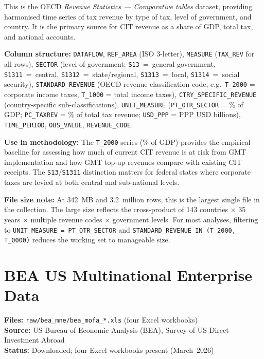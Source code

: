 \documentclass[11pt,a4paper]{article}
\newcommand{\code}[1]{\texttt{#1}}
\begin{document}
This is the OECD \emph{Revenue Statistics --- Comparative tables} dataset, providing harmonised time series of tax revenue by type of tax, level of government, and country.  It is the primary source for CIT revenue as a share of GDP, total tax, and national accounts.

\noindent\textbf{Column structure:} \texttt{DATAFLOW}, \texttt{REF\_AREA} (ISO 3-letter), \texttt{MEASURE} (\code{TAX\_REV} for all rows), \texttt{SECTOR} (level of government: \texttt{S13}~=~general government, \texttt{S1311}~=~central, \texttt{S1312}~=~state/regional, \texttt{S1313}~=~local, \texttt{S1314}~=~social security), \texttt{STANDARD\_REVENUE} (OECD revenue classification code, e.g.\ \texttt{T\_2000} = corporate income taxes, \texttt{T\_1000} = total income taxes), \texttt{CTRY\_SPECIFIC\_REVENUE} (country-specific sub-classifications), \texttt{UNIT\_MEASURE} (\texttt{PT\_OTR\_SECTOR} = \% of GDP; \texttt{PC\_TAXREV} = \% of total tax revenue; \texttt{USD\_PPP} = PPP USD billions), \texttt{TIME\_PERIOD}, \texttt{OBS\_VALUE}, \texttt{REVENUE\_CODE}.

\noindent\textbf{Use in methodology:} The \texttt{T\_2000} series (\% of GDP) provides the empirical baseline for assessing how much of current CIT revenue is at risk from GMT implementation and how GMT top-up revenues compare with existing CIT receipts.  The \texttt{S13}/\texttt{S1311} distinction matters for federal states where corporate taxes are levied at both central and sub-national levels.

\noindent\textbf{File size note:} At 342~MB and 3.2~million rows, this is the largest single file in the collection.  The large size reflects the cross-product of 143 countries $\times$ 35 years $\times$ multiple revenue codes $\times$ government levels.  For most analyses, filtering to \texttt{UNIT\_MEASURE = PT\_OTR\_SECTOR} and \texttt{STANDARD\_REVENUE IN (T\_2000, T\_0000)} reduces the working set to manageable size.


\section{BEA US Multinational Enterprise Data}\label{sec:bea}

\textbf{Files:} \texttt{raw/bea\_mne/bea\_mofa\_*.xls} (four Excel workbooks)\\
\textbf{Source:} US Bureau of Economic Analysis (BEA), Survey of US Direct Investment Abroad\\
\textbf{Status:} Downloaded; four Excel workbooks present (March~2026)
\end{document}
